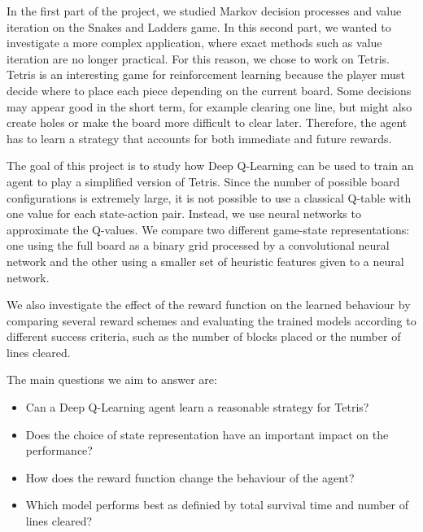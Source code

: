 \documentclass[12pt]{article}
\begin{document}
In the first part of the project, we studied Markov decision processes and value iteration on the Snakes and Ladders game. In this second part, we wanted to investigate a more complex application, where exact methods such as value iteration are no longer practical. For this reason, we chose to work on Tetris. Tetris is an interesting game for reinforcement learning because the player must decide where to place each piece depending on the current board. Some decisions may appear good in the short term, for example clearing one line, but might also create holes or make the board more difficult to clear later. Therefore, the agent has to learn a strategy that accounts for both immediate and future rewards.

The goal of this project is to study how Deep Q-Learning can be used to train an agent to play a simplified version of Tetris. Since the number of possible board configurations is extremely large, it is not possible to use a classical Q-table with one value for each state-action pair. Instead, we use neural networks to approximate the Q-values. We compare two different game-state representations: one using the full board as a binary grid processed by a convolutional neural network and the other using a smaller set of heuristic features given to a neural network.

We also investigate the effect of the reward function on the learned behaviour %
by comparing several reward schemes and evaluating the trained models according to different success criteria, such as the number of blocks placed or the number of lines cleared.

The main questions we aim to answer are:
\begin{itemize}
    \item Can a Deep Q-Learning agent learn a reasonable strategy for Tetris?
    \item Does the choice of state representation have an important impact on the performance?
    \item How does the reward function change the behaviour of the agent?
    \item Which model performs best as definied by total survival time and number of lines cleared?
\end{itemize}
\end{document}

